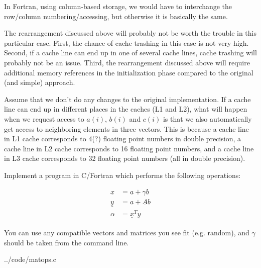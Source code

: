 In Fortran, using column-based storage, we would have to interchange the row/column numbering/accessing, but otherwise it is basically the same.

The rearrangement discussed above will probably not be worth the trouble in this particular case. First, the chance of cache trashing in this case is not very high. Second, if a cache line can end up in one of several cache lines, cache trashing will probably not be an issue. Third, the rearrangement discussed above will require additional memory references in the initialization phase compared to the original (and simple) approach.

Assume that we don't do any changes to the original implementation. If a cache line can end up in different places in the caches (L1 and L2), what will happen when we request access to $a(i)$, $b(i)$ and $c(i)$ is that we also automatically get access to neighboring elements in three vectors. This is because a cache line in L1 cache corresponds to 4(?) floating point numbers in double precision, a cache line in L2 cache corresponds to 16 floating point numbers, and a cache line in L3 cache corresponds to 32 floating point numbers (all in double precision).




\pagebreak
\begin{question}
Implement a program in C/Fortran which performs the following operations:

\begin{equation*}
  \begin{split}
    \underline{x} &= \underline{a} + \gamma\underline{b} \\
    \underline{y} &= \underline{a} + \underline{A}\underline{b} \\
    \alpha &= \underline{x}^T\underline{y}
  \end{split}
\end{equation*}


\noindent You can use any compatible vectors and matrices you see fit (e.g. random), and $\gamma$
should be taken from the command line.
\end{question}


  {../code/matops.c}


